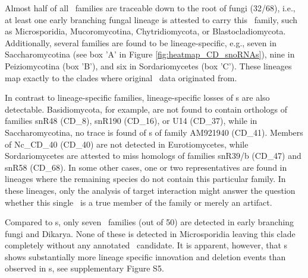 Almost half of all \cd\ families are traceable down to the root of
fungi (32/68), i.e., at least one early branching fungal lineage is
attested to carry this \sno\ family, such as Microsporidia,
Mucoromycotina, Chytridiomycota, or Blastocladiomycota. Additionally,
several families are found to be lineage-specific, e.g., seven in
Saccharomycotina (see box 'A' in Figure \ref{fig:heatmap_CD_snoRNAs}),
nine in Peiziomycotina (box 'B'), and six in Sordariomycetes (box
'C'). These lineages map exactly to the clades where original \sno\
data originated from.


In contrast to lineage-specific families, lineage-specific losses of
\sno s are also detectable. Basidiomycota, for example, are not found
to contain orthologs of families snR48 (CD\_8), snR190 (CD\_16), or
U14 (CD\_37), while in Saccharomycotina, no trace is found of \sno s
of family AM921940 (CD\_41). Members of Nc\_CD\_40 (CD\_40) are not
detected in Eurotiomycetes, while Sordariomycetes are attested to miss
homologs of families snR39/b (CD\_47) and snR58 (CD\_68). In some
other cases, one or two representatives are found in lineages where
the remaining species do not contain this particular family. In these
lineages, only the analysis of target interaction might answer the
question whether this single \sno\ is a true member of the family or
merely an artifact.


%

Compared to \cd s, only seven \haca\ families (out of 50) are detected
in early branching fungi and Dikarya. None of these is detected in
Microsporidia leaving this clade completely without any annotated
\sno\ candidate. It is apparent, however, that \haca s shows
substantially more lineage specific innovation and deletion events
than observed in \cd s, see supplementary Figure S5.

